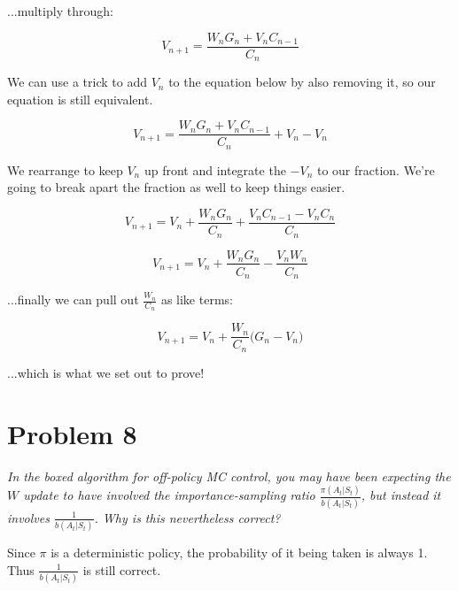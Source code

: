 \documentclass{article}
\begin{document}
...multiply through:

\begin{equation}
    V_{n+1} = \frac{W_n G_n + V_n C_{n-1}}{C_n}
\end{equation}

We can use a trick to add $V_n$ to the equation below by also removing it, so our equation is still equivalent.

\begin{equation}
    V_{n+1} = \frac{W_n G_n + V_n C_{n-1}}{C_n} + V_n - V_n
\end{equation}

We rearrange to keep $V_n$ up front and integrate the $-V_n$ to our fraction. We're going to break apart the fraction as well to keep things easier.

\begin{equation}
    V_{n+1} = V_n + \frac{W_n G_n}{C_n} + \frac{V_n C_{n-1}- V_n C_n}{C_n}
\end{equation}

\begin{equation}
    V_{n+1} = V_n + \frac{W_n G_n}{C_n} - \frac{V_n W_n} {C_n}
\end{equation}

...finally we can pull out $\frac{W_n}{C_n}$ as like terms:

\begin{equation}
    V_{n+1} = V_n + \frac{W_n}{C_n} \bigg(G_n - V_n \bigg)
\end{equation}

...which is what we set out to prove!

\section*{Problem 8}
\textit{In the boxed algorithm for off-policy MC control, you may have been expecting the $W$ update to have involved the importance-sampling ratio $\frac{\pi(A_t|S_t)}{b(A_t|S_t)}$, but instead it involves $\frac{1}{b(A_t|S_t)}$. Why is this nevertheless correct?}

Since $\pi$ is a deterministic policy, the probability of it being taken is always 1. Thus $\frac{1}{b(A_t|S_t)}$ is still correct.
\end{document}

